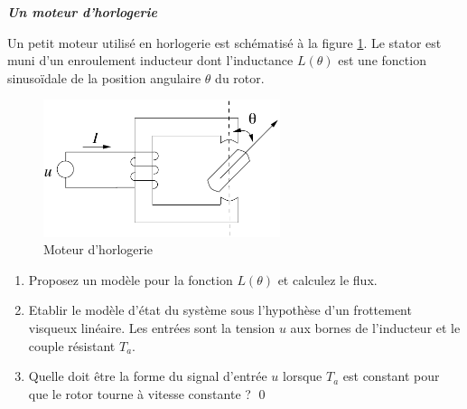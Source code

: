 \begin{exercice}{\bf \em Un moteur d'horlogerie}

Un petit moteur utilisé en horlogerie est schématisé à la figure
\ref{fig:mothor}.  Le stator est muni d'un enroulement inducteur dont l'inductance
$L(\theta)$ est une fonction sinusoïdale de la position angulaire $\theta$ du rotor.
\begin{figure}[htbp]
\begin{center}
\includegraphics[height=40mm]{mothor}
\caption{Moteur d'horlogerie}
\label{fig:mothor}
\end{center}
\end{figure}
\begin{enumerate}
\item Proposez un modèle pour la fonction $L(\theta)$ et calculez le flux.
\item Etablir le modèle d'état du système sous l'hypothèse d'un frottement 
visqueux linéaire. Les entrées sont la tension $u$ aux 
bornes de l'inducteur et le couple résistant $T_a$.
\item Quelle doit être la forme du signal d'entrée $u$ lorsque $T_a$ est constant pour 
que le rotor tourne à vitesse constante ? \qed
\end{enumerate}
\end{exercice}
\newpage


